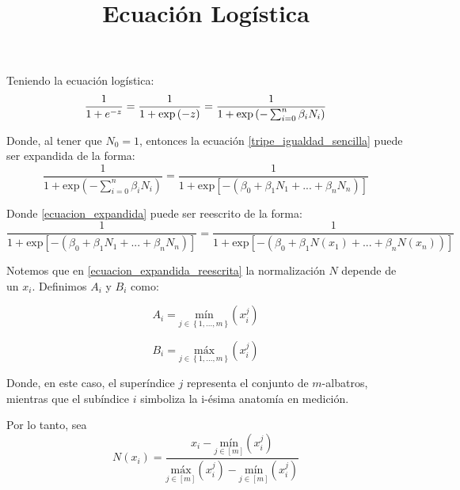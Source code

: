 \documentclass{article}
\begin{document}
\title{Ecuación Logística}
\maketitle
Teniendo la ecuación logística:
\begin{equation}
    \label{tripe_igualdad_sencilla}
    \frac{1}{1+e^{-z}} = \frac{1}{1+\mbox{\mbox{exp}}\left ( -z\right )} = \frac{1}{1+\mbox{\mbox{exp}}\left (-\sum_{i=0}^{n} \beta _{i}N_{i} \right )}
\end{equation}

Donde, al tener que $N_{0}=1$, entonces la ecuación \ref{tripe_igualdad_sencilla} puede ser expandida de la forma:
\begin{equation}
    \label{ecuacion_expandida}
    \frac{1}{1+\mbox{exp}\left (-\sum_{i=0}^{n} \beta _{i}N_{i} \right )} = \frac{1}{1+\mbox{exp}\left [ -\left ( \beta _{0} + \beta _{1}N_{1}+...+\beta_{n}N_{n} \right ) \right ]}
\end{equation}

Donde \ref{ecuacion_expandida} puede ser reescrito de la forma:
\begin{equation}
    \label{ecuacion_expandida_reescrita}    
    \frac{1}{1+\mbox{exp}\left [ -\left ( \beta _{0} + \beta _{1}N_{1}+...+\beta_{n}N_{n} \right ) \right ]} = \frac{1}{1+\mbox{exp}\left [ -\left ( \beta _{0} + \beta _{1}N(x_{1})+...+\beta_{n}N(x_{n})\right ) \right ]}
\end{equation}

Notemos que en \ref{ecuacion_expandida_reescrita} la normalización $N$ depende de un $x_{i}$. Definimos $A_{i}$ y $B_{i}$ como:

\begin{equation}
    \label{maximos_A}
    A_{i}= \underset{j\in \left \{ 1,...,m \right \}}{\mbox{mín}}\left ( x_{i}^{j} \right )
\end{equation}

\begin{equation}
    \label{minimos_B}
    B_{i}= \underset{j\in \left \{ 1,...,m \right \}}{\mbox{máx}}\left ( x_{i}^{j} \right )
\end{equation}

Donde, en este caso, el superíndice $j$ representa el conjunto de $m$-albatros, mientras que el subíndice $i$ simboliza la i-ésima anatomía en medición.

Por lo tanto, sea 
\begin{equation} \label{normalizacion} N\left ( x_{i} \right )= \frac{x_{i} - \underset{j\in [m ]}{\mbox{mín}}\left (  x_{i}^{j}\right )}{\underset{j\in [m ]}{\mbox{máx}}\left (  x_{i}^{j}\right )-\underset{j\in [m ]}{\mbox{mín}}\left (  x_{i}^{j}\right )}
\end{equation}
\end{document}
